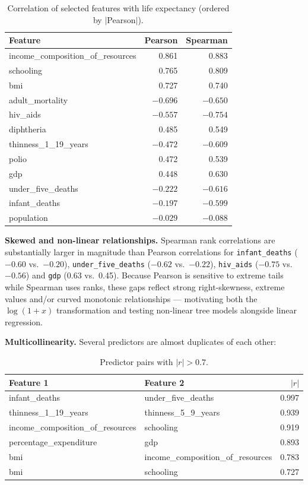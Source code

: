 \documentclass[12pt,a4paper]{article}
\begin{document}
\begin{table}[H]\centering
\caption{Correlation of selected features with life expectancy (ordered by $|$Pearson$|$).}
\begin{tabular}{lrr}\toprule
\textbf{Feature} & \textbf{Pearson} & \textbf{Spearman}\\\midrule
income\_composition\_of\_resources & 0.861 & 0.883\\
schooling & 0.765 & 0.809\\
bmi & 0.727 & 0.740\\
adult\_mortality & $-0.696$ & $-0.650$\\
hiv\_aids & $-0.557$ & $-0.754$\\
diphtheria & 0.485 & 0.549\\
thinness\_1\_19\_years & $-0.472$ & $-0.609$\\
polio & 0.472 & 0.539\\
gdp & 0.448 & 0.630\\
under\_five\_deaths & $-0.222$ & $-0.616$\\
infant\_deaths & $-0.197$ & $-0.599$\\
population & $-0.029$ & $-0.088$\\\bottomrule
\end{tabular}\end{table}

\textbf{Skewed and non-linear relationships.} Spearman rank correlations are substantially larger
in magnitude than Pearson correlations for \texttt{infant\_deaths} ($-0.60$ vs.\ $-0.20$),
\texttt{under\_five\_deaths} ($-0.62$ vs.\ $-0.22$), \texttt{hiv\_aids} ($-0.75$ vs.\ $-0.56$)
and \texttt{gdp} (0.63 vs.\ 0.45). Because Pearson is sensitive to extreme tails while Spearman
uses ranks, these gaps reflect strong right-skewness, extreme values and/or curved monotonic
relationships --- motivating both the $\log(1+x)$ transformation and testing non-linear tree
models alongside linear regression.

\textbf{Multicollinearity.} Several predictors are almost duplicates of each other:
\begin{table}[H]\centering
\caption{Predictor pairs with $|r|>0.7$.}
\begin{tabular}{llr}\toprule
\textbf{Feature 1} & \textbf{Feature 2} & \textbf{$|r|$}\\\midrule
infant\_deaths & under\_five\_deaths & 0.997\\
thinness\_1\_19\_years & thinness\_5\_9\_years & 0.939\\
income\_composition\_of\_resources & schooling & 0.919\\
percentage\_expenditure & gdp & 0.893\\
bmi & income\_composition\_of\_resources & 0.783\\
bmi & schooling & 0.727\\\bottomrule
\end{tabular}\end{table}
\end{document}

